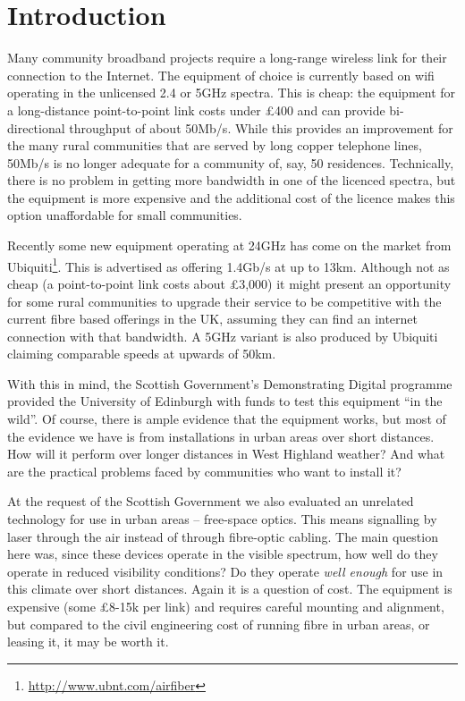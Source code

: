 \documentclass{amsart}
\begin{document}
\section{Introduction}\label{introduction}
Many community broadband projects require a long-range wireless link
for their connection to the Internet. The equipment of choice is
currently based on wifi operating in the unlicensed 2.4 or 5GHz
spectra. This is cheap: the equipment for a long-distance
point-to-point link costs under \pounds 400 and can provide
bi-directional throughput of about 50Mb/s. While this provides an
improvement for the many rural communities that are served by long
copper telephone lines, 50Mb/s is no longer adequate for a community
of, say, 50 residences. Technically, there is no problem in getting
more bandwidth in one of the licenced spectra, but the equipment is
more expensive and the additional cost of the licence makes this
option unaffordable for small communities.

Recently some new equipment operating at 24GHz has come on the market
from Ubiquiti\footnote{\href{http://www.ubnt.com/airfiber}{\url{http://www.ubnt.com/airfiber}}}.
This is advertised as offering 1.4Gb/s at up to 13km. Although not as
cheap (a point-to-point link costs about \pounds 3,000) it might present
an opportunity for some rural communities to upgrade their service to
be competitive with the current fibre based offerings in the UK,
assuming they can find an internet connection with that bandwidth. A
5GHz variant is also produced by Ubiquiti claiming comparable speeds
at upwards of 50km.

With this in mind, the Scottish Government's Demonstrating
Digital programme provided the University of Edinburgh with funds to
test this equipment ``in the wild''. Of course, there is ample evidence
that the equipment works, but most of the evidence we have is
from installations in urban areas over short distances. How will
it perform over longer distances in West Highland weather? And what
are the practical problems faced by communities who want to install it?

At the request of the Scottish Government we also evaluated an
unrelated technology for use in urban areas -- free-space optics. This
means signalling by laser through the air instead of through
fibre-optic cabling. The main question here was, since these devices
operate in the visible spectrum, how well do they operate in reduced
visibility conditions? Do they operate \emph{well enough} for use in
this climate over short distances. Again it is a question of cost. The
equipment is expensive (some \pounds 8-15k per link) and requires
careful mounting and alignment, but compared to the civil engineering
cost of running fibre in urban areas, or leasing it, it may be worth
it.



\end{document}
